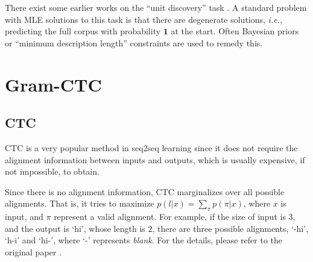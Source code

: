 \documentclass{article}
\begin{document}
There exist some earlier works on the ``unit discovery'' task \cite{cartwright1994segmenting,goldwater2006contextual}. A standard problem with MLE solutions to this task is that there are degenerate solutions, \textit{i.e.}, predicting the full corpus with probability $\mathbf{1}$ at the start. Often Bayesian priors or ``minimum description length'' constraints are used to remedy this. 




\section{Gram-CTC}

\subsection{CTC}
CTC \cite{graves2006connectionist} is a very popular method in seq2seq learning since it does not require the alignment information between inputs and outputs, which is usually expensive, if not impossible, to obtain.

Since there is no alignment information, CTC marginalizes over all possible alignments. That is, it tries to maximize $p(l|x) = \sum_{\pi}p(\pi|x)$, where $x$ is input, and $\pi$ represent a valid alignment. For example, if the size of input is $3$, and the output is `hi', whose length is $2$, there are three possible alignments, `-hi', `h-i' and `hi-', where `-' represents \emph{blank}. For the details, please refer to the original paper \cite{graves2006connectionist}.



\vspace{-2pt}
\end{document}
